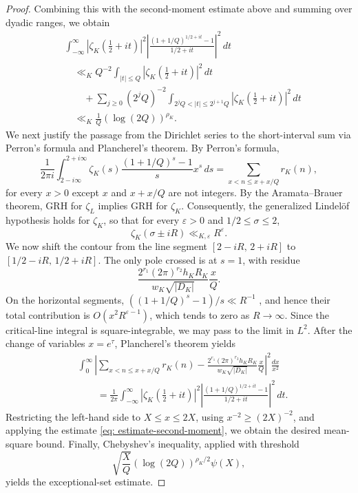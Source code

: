 \documentclass[twoside,reqno,11pt,a4paper]{amsart}
\numberwithin{equation}{section}
\theoremstyle{plain}
\theoremstyle{definition}
\theoremstyle{remark}
\renewcommand{\le}{\leqslant}
\renewcommand{\ge}{\geqslant}
\begin{document}
\begin{proof}
 Combining this with the second-moment estimate above and summing over dyadic ranges, we obtain
\begin{align}
\nonumber &\int_{-\infty}^{\infty}
\left|\zeta_K\left(\frac12+it\right)\right|^2
\left|\frac{(1+1/Q)^{1/2+it}-1}{1/2+it}\right|^2\,dt\\
\nonumber&\quad\ll_K Q^{-2}\int_{|t|\le Q}
\left|\zeta_K\left(\frac12+it\right)\right|^2\,dt\\
\nonumber&\qquad+\sum_{j\ge0}(2^jQ)^{-2}
\int_{2^jQ<|t|\le2^{j+1}Q}
\left|\zeta_K\left(\frac12+it\right)\right|^2\,dt\\
&\quad\ll_K\frac1Q\left(\log(2Q)\right)^{\rho_K}. \label{eq: estimate-second-moment}
\end{align}
We next justify the passage from the Dirichlet series to the short-interval sum via Perron's formula and Plancherel's theorem. By Perron's formula, 
\begin{equation*}
\frac1{2\pi i}\int_{2-i\infty}^{2+i\infty}
\zeta_K(s)\frac{(1+1/Q)^s-1}{s}x^s\,ds =\sum_{x<n\le x+x/Q}r_K(n),
\end{equation*}
for every $x>0$ except $x$ and $x+x/Q$ are not integers.
By the Aramata--Brauer theorem, GRH for $\zeta_L$ implies GRH for $\zeta_K$. Consequently, the generalized Lindelöf hypothesis holds for $\zeta_K$, so that for every $\varepsilon>0$ and $1/2\le\sigma\le2$,
\begin{equation*}
\zeta_K(\sigma\mathbin{\pm}iR)\ll_{K,\varepsilon}R^\varepsilon.
\end{equation*}
We now shift the contour from the line segment $[2-iR,\,2+iR]$ to $[1/2-iR,\,1/2+iR]$. The only pole crossed is at $s=1$, with residue
\begin{equation*}
\frac{2^{r_1}(2\pi)^{r_2}h_KR_K}
{w_K\sqrt{|D_K|}}\frac{x}{Q}.
\end{equation*}
On the horizontal segments,
$((1+1/Q)^s-1)/s\ll R^{-1} $ ,
and hence their total contribution is
$O(x^2R^{\varepsilon-1})$,
which tends to zero as $R\to\infty$. Since the critical-line integral is square-integrable, we may pass to the limit in $L^2$. After the change of variables $x=e^\tau$, Plancherel's theorem yields
\begin{align*}
&\int_0^\infty
\left|\sum_{x<n\le x+x/Q}r_K(n)
-\frac{2^{r_1}(2\pi)^{r_2}h_KR_K}
{w_K\sqrt{|D_K|}}\frac{x}{Q}\right|^2\frac{dx}{x^2}\\
&\qquad=\frac1{2\pi}\int_{-\infty}^{\infty}
\left|\zeta_K\left(\frac12+it\right)\right|^2
\left|\frac{(1+1/Q)^{1/2+it}-1}{1/2+it}\right|^2\,dt.
\end{align*}
Restricting the left-hand side to $X\le x\le2X$, using $x^{-2}\ge (2X)^{-2}$, and applying the estimate \eqref{eq: estimate-second-moment}, we obtain the desired mean-square bound. Finally, Chebyshev's inequality, applied with threshold
\begin{equation*}
\sqrt{\frac{X}{Q}}\left(\log(2Q)\right)^{\rho_K/2}\psi(X),
\end{equation*}
yields the exceptional-set estimate.
\end{proof}
\end{document}
